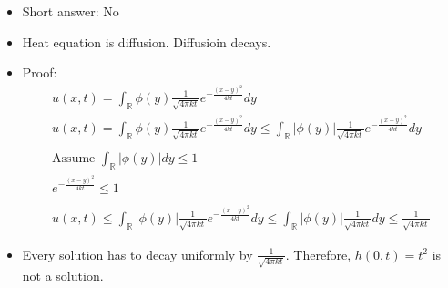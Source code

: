 \documentclass[12pt, a4paper]{article}
\begin{document}
\begin{itemize}
    \item Short answer: No
    \item Heat equation is diffusion. Diffusioin decays.
    \item Proof:
    \begin{gather*}
        u(x, t) = \int_{\mathbb{R}} \phi(y) \frac{1}{\sqrt{4\pi kt}}e^{-\frac{(x-y)^2}{4kt}}dy\\
        u(x, t) = \int_{\mathbb{R}} \phi(y) \frac{1}{\sqrt{4\pi kt}}e^{-\frac{(x-y)^2}{4kt}}dy \leq \int_{\mathbb{R}} |\phi(y)| \frac{1}{\sqrt{4\pi kt}}e^{-\frac{(x-y)^2}{4kt}}dy\\\\
        \text{Assume } \int_{\mathbb{R}} |\phi(y)|dy \leq 1\\
        e^{-\frac{(x-y)^2}{4kt}} \leq 1\\\\
        u(x, t) \leq \int_{\mathbb{R}} |\phi(y)| \frac{1}{\sqrt{4\pi kt}}e^{-\frac{(x-y)^2}{4kt}}dy \leq \int_{\mathbb{R}} |\phi(y)| \frac{1}{\sqrt{4\pi kt}}dy \leq \frac{1}{\sqrt{4\pi kt}}
    \end{gather*}
    \item Every solution has to decay uniformly by $\frac{1}{\sqrt{4\pi kt}}$. Therefore, $h(0, t) = t^2$ is not a solution.
\end{itemize}
\vspace{0.3em}
\end{document}
